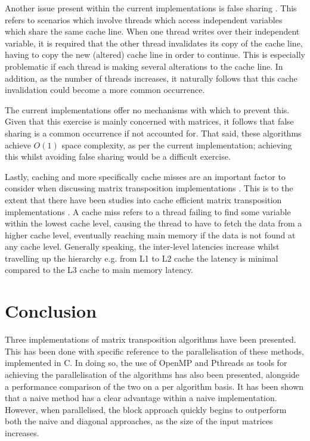 \documentclass[journal,10pt]{IEEEtran}
\begin{document}
Another issue present within the current implementations is false sharing \cite{false}. This refers to scenarios which involve threads which access independent variables which share the same cache line. When one thread writes over their independent variable, it is required that the other thread invalidates its copy of the cache line, having to copy the new (altered) cache line in order to continue. This is especially problematic if each thread is making several alterations to the cache line. In addition, as the number of threads increases, it naturally follows that this cache invalidation could become a more common occurrence. 

The current implementations offer no mechanisms with which to prevent this. Given that this exercise is mainly concerned with matrices, it follows that false sharing is a common occurrence if not accounted for. That said, these algorithms achieve $O(1)$ space complexity, as per the current implementation; achieving this whilst avoiding false sharing would be a difficult exercise.

Lastly, caching and more specifically cache misses are an important factor to consider when discussing matrix transposition implementations \cite{cmiss}. This is to the extent that there have been studies into cache efficient matrix transposition implementations \cite{c1,c2}. A cache miss refers to a thread failing to find some variable within the lowest cache level, causing the thread to have to fetch the data from a higher cache level, eventually reaching main memory if the data is not found at any cache level. Generally speaking, the inter-level latencies increase whilst travelling up the hierarchy e.g. from L1 to L2 cache the latency is minimal compared to the L3 cache to main memory latency. %



\section{Conclusion}
Three implementations of matrix transposition algorithms have been presented. This has been done with specific reference to the parallelisation of these methods, implemented in C. In doing so, the use of OpenMP and Pthreads as tools for achieving the parallelisation of the algorithms has also been presented, alongside a performance comparison of the two on a per algorithm basis. It has been shown that a naive method has a clear advantage within a naive implementation. However, when parallelised, the block approach quickly begins to outperform both the naive and diagonal approaches, as the size of the input matrices increases.
\end{document}
